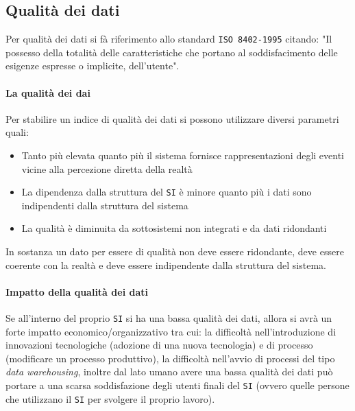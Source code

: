     \subsection{Qualità dei dati}
        Per qualità dei dati si fà riferimento allo standard \texttt{ISO 8402-1995} citando: "Il possesso della totalità delle caratteristiche che portano al soddisfacimento delle esigenze espresse o implicite, dell'utente".
        \paragraph{La qualità dei dai}
            Per stabilire un indice di qualità dei dati si possono utilizzare diversi parametri quali:
            \begin{itemize}
                \item Tanto più elevata quanto più il sistema fornisce rappresentazioni degli eventi vicine alla percezione diretta della realtà
                \item La dipendenza dalla struttura del \texttt{SI} è minore quanto più i dati sono indipendenti dalla struttura del sistema
                \item La qualità è diminuita da sottosistemi non integrati e da dati ridondanti
            \end{itemize}
            In sostanza un dato per essere di qualità non deve essere ridondante, deve essere coerente con la realtà e deve essere indipendente dalla struttura del sistema.
        \paragraph{Impatto della qualità dei dati}
            Se all'interno del proprio \texttt{SI} si ha una bassa qualità dei dati, allora si avrà un forte impatto economico/organizzativo tra cui: la difficoltà nell'introduzione di innovazioni tecnologiche (adozione di una nuova tecnologia) e di processo (modificare un processo produttivo), la difficoltà nell'avvio di processi del tipo \textit{data warehousing}, inoltre dal lato umano avere una bassa qualità dei dati può portare a una scarsa soddisfazione degli utenti finali del \texttt{SI} (ovvero quelle persone che utilizzano il \texttt{SI} per svolgere il proprio lavoro).
